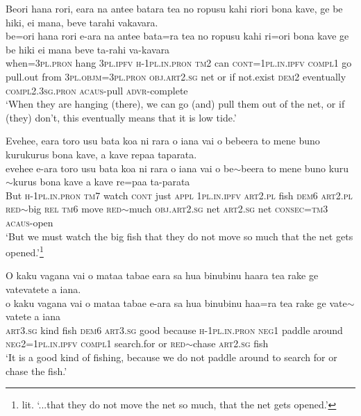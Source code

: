 \ea\label{ex:text24-11}
Beori hana rori, eara na antee batara tea no ropusu kahi riori bona kave, ge be hiki, ei mana, beve tarahi vakavara.\\
\gll be=ori	hana	rori	e-ara	na	antee	bata=ra	tea	no	ropusu	kahi	ri=ori	bona	kave	ge	be	hiki	ei	mana	beve	ta-rahi	va-kavara\\
     when=3\textsc{pl}.\textsc{pron}	hang	3\textsc{pl}.\textsc{ipfv}	\textsc{h}-1\textsc{pl}.\textsc{in}.\textsc{pron}	\textsc{tm}2	can	\textsc{cont}=1\textsc{pl}.\textsc{in}.\textsc{ipfv}	\textsc{compl}1	go	pull.out	from	3\textsc{pl}.\textsc{objm}=3\textsc{pl}.\textsc{pron}	\textsc{obj}.\textsc{art}2.\textsc{sg}	net	or	if	not.exist	\textsc{dem}2	eventually	\textsc{compl}2.3\textsc{sg}.\textsc{pron}	\textsc{acaus}-pull	\textsc{advr}-complete\\
\glt `When they are hanging (there), we can go (and) pull them out of the net, or if (they) don't, this eventually means that it is low tide.'
\z

\ea\label{ex:text24-12}
Evehee, eara toro usu bata koa ni rara o iana vai o bebeera to mene buno kurukurus bona kave, a kave repaa taparata.\\
\gll evehee	e-ara	toro	usu	bata	koa	ni	rara	o	iana	vai	o	be{$\sim$}beera	to	mene	buno	kuru{$\sim$}kurus	bona	kave	a	kave	re=paa	ta-parata\\
     But	\textsc{h}-1\textsc{pl}.\textsc{in}.\textsc{pron}	\textsc{tm}7	watch	\textsc{cont}	just	\textsc{appl}	1\textsc{pl}.\textsc{in}.\textsc{ipfv}	\textsc{art}2.\textsc{pl}	fish	\textsc{dem}6	\textsc{art}2.\textsc{pl}	\textsc{red}{$\sim$}big	\textsc{rel}	\textsc{tm}6	move	\textsc{red}{$\sim$}much	\textsc{obj}.\textsc{art}2.\textsc{sg}	net	\textsc{art}2.\textsc{sg}	net	\textsc{consec}=\textsc{tm}3	\textsc{acaus}-open\\
\glt `But we must watch the big fish that they do not move so much that the net gets opened.'\footnote{lit. `...that they do not move the net so much, that the net gets opened.'}
\z

\ea\label{ex:text24-13}
O kaku vagana vai o mataa tabae eara sa hua binubinu haara tea rake ge vatevatete a iana.\\
\gll o	kaku	vagana	vai	o	mataa	tabae	e-ara	sa	hua	binubinu	haa=ra	tea	rake	ge	vate{$\sim$}vatete	a	iana\\
     \textsc{art}3.\textsc{sg}	kind	fish	\textsc{dem}6	\textsc{art}3.\textsc{sg}	good	because	\textsc{h}-1\textsc{pl}.\textsc{in}.\textsc{pron}	\textsc{neg}1	paddle	around	\textsc{neg}2=1\textsc{pl}.\textsc{in}.\textsc{ipfv}	\textsc{compl}1	search.for	or	\textsc{red}{$\sim$}chase	\textsc{art}2.\textsc{sg}	fish\\
\glt `It is a good kind of fishing, because we do not paddle around to search for or chase the fish.'
\z


